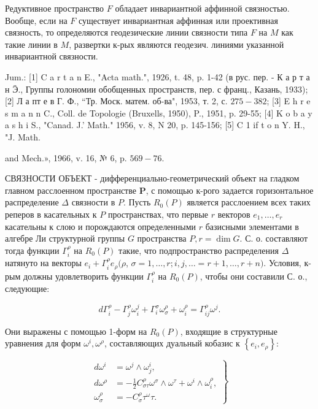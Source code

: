 \documentclass[10pt]{article}
\begin{document}
Редуктивное пространство $F$ обладает инвариантной аффинной связностью. Вообще, если на $F$ существует инвариантная аффинная или проективная связность, то определяются геодезические линии связности типа $F$ на $M$ как такие линии в $M$, развертки к-рых являются геодезич. линиями указанной инвариантной связности.



Jum.: [1] C a r t a n E., "Acta math.", 1926, t. 48, p. 1-42 (в рус. пер. - К а р т а н Ӭ., Группы голономии обобщенных пространств, пер. с франц., Казань, 1933); [2] Л а пт е в Г. Ф., “Тр. Моск. матем. об-ва", 1953, т. 2, с. $275-382$; [3] E h r e s m a n n C., Coll. de Topologie (Bruxells, 1950), P., 1951, p. 29-55; [4] K o b a y a s h i S., "Canad. J.' Math." 1956, v. 8, N 20, p. 145-156; [5] C 1 if t o n Y. H., "J. Math.

and Mech.», 1966, v. 16, № 6, p. $569-76$.



СВЯЗНОСТИ ОБЪЕКТ - дифференциально-геометрический объект на гладком главном расслоенном пространстве $\boldsymbol{P}$, с помощью к-рого задается горизонтальное распределение $\Delta$ связности в $P$. Пусть $R_{0}(P)$ является расслоением всех таких реперов в касательных к $P$ пространствах, что первые $r$ векторов $e_{1}, \ldots, e_{r}$ касательны к слою и порождаются определенными $r$ базисными элементами в алгебре Ли структурной группы $G$ пространства $P, r=\operatorname{dim} G$. С. о. составляют тогда функции $\Gamma_{i}^{\rho}$ на $R_{0}(P)$ такие, что подпространство распределения $\Delta$ натянуто на векторы $e_{i}+\Gamma_{i}^{\rho} e_{\rho}(\rho$, $\sigma=1, \ldots, r ; i, j, \ldots=r+1, \ldots, r+n)$. Условия, к-рым должны удовлетворить функции $\Gamma_{i}^{\rho}$ на $R_{0}(P)$, чтобы они составили С. о., следующие:



\[

d \Gamma_{i}^{\rho}-\Gamma_{j}^{\rho} \omega_{i}^{j}+\Gamma_{i}^{\sigma} \omega_{\sigma}^{\rho}+\omega_{i}^{\rho}=\Gamma_{i j}^{\rho} \omega^{j} .

\]



Они выражены с помощью 1-форм на $R_{0}(P)$, входящие в структурные уравнения для форм $\omega^{i}, \omega^{\rho}$, составляющих дуальный кобазис к $\left\{e_{i}, e_{\rho}\right\}:$



\[

\left.\begin{array}{rl}

d \omega^{i} & =\omega^{j} \wedge \omega_{j}^{i}, \\

d \omega^{\rho} & =-\frac{1}{2} C_{\sigma \tau}^{\rho} \omega^{\sigma} \wedge \omega^{\tau}+\omega^{i} \wedge \omega_{i}^{\rho}, \\

\omega_{\sigma}^{\rho} & =-C_{\sigma}^{\rho} \tau^{\omega} \tau .

\end{array}\right\}

\]
\end{document}
